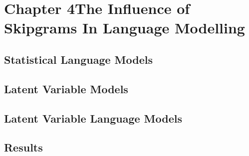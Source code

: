 \chapter{Chapter 4\newline The Influence of Skipgrams In Language Modelling}

\section{Statistical Language Models}
\label{ch:languagemodels}


\section{Latent Variable Models}
\label{ch:latentvariablemodels}


\section{Latent Variable Language Models}
\label{ch:latentvariablelanguagemodels}


\section{Results}
\label{ch:results}
